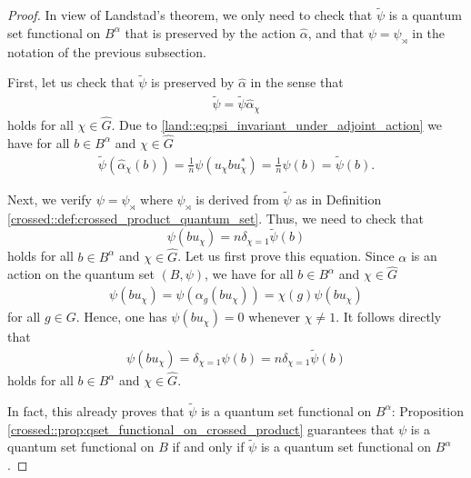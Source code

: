 \documentclass{amsart}
\theoremstyle{definition}
\theoremstyle{definition}
\begin{document}
\begin{proof}
    In view of Landstad's theorem, we only need to check that $\tilde{\psi}$ is a quantum set functional on $B^\alpha$ that is preserved by the action $\hat{\alpha}$, and that $\psi = \psi_\rtimes$ in the notation of the previous subsection. 

    First, let us check that $\tilde{\psi}$ is preserved by $\hat{\alpha}$ in the sense that
    \begin{align*}
        \tilde{\psi} = \tilde{\psi} \hat{\alpha}_\chi
    \end{align*}
    holds for all $\chi \in \hat{G}$. Due to \eqref{land::eq:psi_invariant_under_adjoint_action} we have for all $b \in B^\alpha$ and $\chi \in \hat{G}$
    \begin{align*}
        \tilde{\psi}(\hat{\alpha}_\chi(b)) 
            = \frac{1}{n} \psi(u_\chi b u_\chi^\ast) 
            = \frac{1}{n} \psi(b)
            = \tilde{\psi}(b).
    \end{align*}
    
    Next, we verify $\psi = \psi_\rtimes$ where $\psi_\rtimes$ is derived from $\tilde{\psi}$ as in Definition \ref{crossed::def:crossed_product_quantum_set}. Thus, we need to check that
    $$
        \psi(b u_\chi) = n \delta_{\chi=1} \tilde{\psi}(b)
    $$ 
    holds for all $b \in B^\alpha$ and $\chi \in \hat{G}$.
    Let us first prove this equation. Since $\alpha$ is an action on the quantum set $(B, \psi)$, we have for all $b \in B^\alpha$ and $\chi \in \hat{G}$
    \begin{align*}
        \psi(b u_\chi) = \psi(\alpha_g(b u_\chi)) = \chi(g) \psi(b u_\chi)
    \end{align*}
    for all $g \in G$. Hence, one has $\psi(b u_\chi) = 0$ whenever $\chi \neq 1$. It follows directly that
    \begin{align*}
        \psi(b u_\chi) = \delta_{\chi=1} \psi(b) = n \delta_{\chi=1} \tilde{\psi}(b)
    \end{align*}
    holds for all $b \in B^\alpha$ and $\chi \in \hat{G}$.
    
    In fact, this already proves that $\tilde{\psi}$ is a quantum set functional on $B^\alpha$: Proposition \ref{crossed::prop:qset_functional_on_crossed_product} guarantees that $\psi$ is a quantum set functional on $B$ if and only if $\tilde{\psi}$ is a quantum set functional on $B^\alpha$.
\end{proof}
\end{document}
